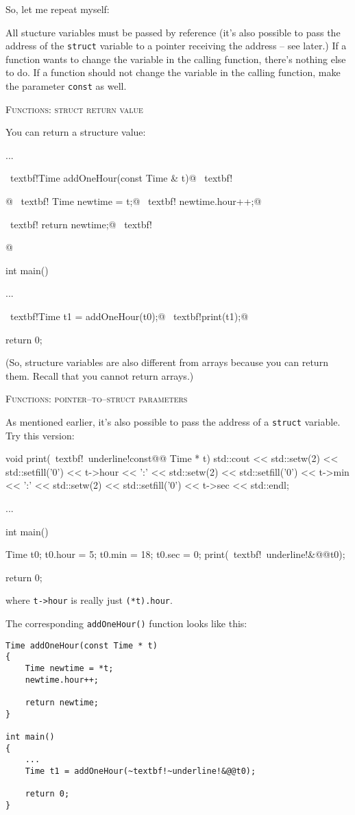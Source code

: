 So, let me repeat myself:

All stucture variables must be passed by reference (it's also possible to pass
the address of the \verb!struct! variable to a pointer receiving the address --
see later.) If a function wants to change the variable in the calling function,
there's nothing else to do. If a function should not change the variable in the
calling function, make the parameter \verb!const! as well.




\textsc{Functions: struct return value}

You can return a structure value:
\begin{console}[commandchars=~!@]
...

~textbf!Time addOneHour(const Time & t)@
~textbf!{@
~textbf!    Time newtime = t;@
~textbf!    newtime.hour++;@

~textbf!    return newtime;@
~textbf!}@

int main()
{
    ...

    ~textbf!Time t1 = addOneHour(t0);@
    ~textbf!print(t1);@

    return 0;
}
\end{console}

(So, structure variables are also different from arrays because you can return
them. Recall that you cannot return arrays.)




\textsc{Functions: pointer--to--struct parameters}

As mentioned earlier, it's also possible to pass the address of a
\verb!struct! variable. Try this version:
\begin{console}[commandchars=~!@]
void print(~textbf!~underline!const@@ Time * t)
{
    std::cout << std::setw(2) << std::setfill('0') << t->hour 
              << ':'
              << std::setw(2) << std::setfill('0') << t->min 
              << ':'
              << std::setw(2) << std::setfill('0') << t->sec
              << std::endl;
}

... 

int main()
{
    Time t0;
    t0.hour = 5;
    t0.min = 18;
    t0.sec = 0;
    print(~textbf!~underline!&@@t0);

    return 0;
}
\end{console}
where \verb!t->hour! is really just \verb!(*t).hour!.

The corresponding \verb!addOneHour()! function looks like this:
\begin{Verbatim}[frame=single, commandchars=~!@]
Time addOneHour(const Time * t)
{
    Time newtime = *t;
    newtime.hour++;

    return newtime;
}

int main()
{
    ...
    Time t1 = addOneHour(~textbf!~underline!&@@t0);

    return 0;
}
\end{Verbatim}

